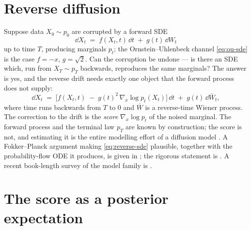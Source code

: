 \section{Reverse diffusion}\label{sec:reversal}

Suppose data $X_0 \sim p_0$ are corrupted by a forward SDE
\begin{equation}
  \dd X_t \;=\; f(X_t, t)\,\dd t \;+\; g(t)\, \dd W_t
  \label{eq:generic-sde}
\end{equation}
up to time $T$, producing marginals $p_t$; the Ornstein--Uhlenbeck channel
\eqref{eq:ou-sde} is the case $f = -x$, $g = \sqrt{2}$. Can the corruption be
undone --- is there an SDE which, run from $X_T \sim p_T$ backwards, reproduces
the same marginals? The answer \citep{anderson1982reverse} is yes, and the
reverse drift needs exactly one object that the forward process does not
supply:
\begin{equation}
  \dd X_t \;=\;
  \Big[ f(X_t, t) \;-\; g(t)^2\, \nabla_x \log p_t(X_t) \Big]\,\dd t
  \;+\; g(t)\, \dd \bar W_t ,
  \label{eq:reverse-sde}
\end{equation}
where time runs backwards from $T$ to $0$ and $\bar W$ is a reverse-time Wiener
process. The correction to the drift is the \emph{score} $\nabla_x \log p_t$ of
the noised marginal. The forward process and the terminal law $p_T$ are known by
construction; the score is not, and estimating it is the entire modelling effort
of a diffusion model \citep{sohl2015deep, ho2020denoising, song2021scorebased}.
A Fokker--Planck argument making \eqref{eq:reverse-sde} plausible, together
with the probability-flow ODE it produces, is given in \compendium{}; the
rigorous statement is \citet{anderson1982reverse}. A recent book-length survey
of the model family is \citet{lai2025principles}.

\section{The score as a posterior expectation}\label{sec:tweedie}

